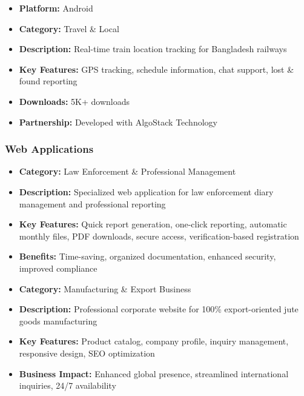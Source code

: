 \begin{itemize}
    \item \textbf{Platform:} Android
    \item \textbf{Category:} Travel \& Local
    \item \textbf{Description:} Real-time train location tracking for Bangladesh railways
    \item \textbf{Key Features:} GPS tracking, schedule information, chat support, lost \& found reporting
    \item \textbf{Downloads:} 5K+ downloads
    \item \textbf{Partnership:} Developed with AlgoStack Technology
\end{itemize}

\subsubsection{Web Applications}

\begin{itemize}
    \item \textbf{Category:} Law Enforcement \& Professional Management
    \item \textbf{Description:} Specialized web application for law enforcement diary management and professional reporting
    \item \textbf{Key Features:} Quick report generation, one-click reporting, automatic monthly files, PDF downloads, secure access, verification-based registration
    \item \textbf{Benefits:} Time-saving, organized documentation, enhanced security, improved compliance
\end{itemize}

\begin{itemize}
    \item \textbf{Category:} Manufacturing \& Export Business
    \item \textbf{Description:} Professional corporate website for 100\% export-oriented jute goods manufacturing
    \item \textbf{Key Features:} Product catalog, company profile, inquiry management, responsive design, SEO optimization
    \item \textbf{Business Impact:} Enhanced global presence, streamlined international inquiries, 24/7 availability
\end{itemize}

